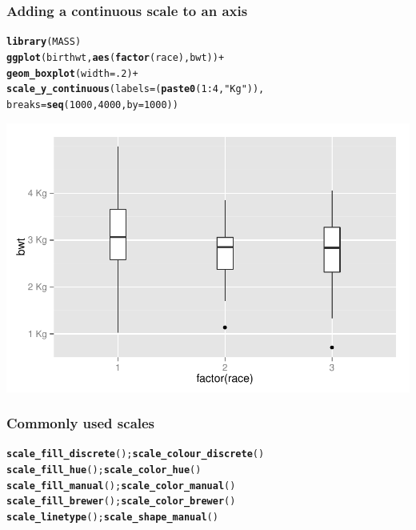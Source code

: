 \documentclass{beamer}\usepackage[]{graphicx}\usepackage[]{color}
\makeatletter
\newcommand{\hlnum}[1]{\textcolor[rgb]{0.686,0.059,0.569}{#1}}%
\newcommand{\hlstr}[1]{\textcolor[rgb]{0.192,0.494,0.8}{#1}}%
\newcommand{\hlopt}[1]{\textcolor[rgb]{0,0,0}{#1}}%
\newcommand{\hlstd}[1]{\textcolor[rgb]{0.345,0.345,0.345}{#1}}%
\newcommand{\hlkwc}[1]{\textcolor[rgb]{0.333,0.667,0.333}{#1}}%
\newcommand{\hlkwd}[1]{\textcolor[rgb]{0.737,0.353,0.396}{\textbf{#1}}}%
\newenvironment{kframe}{%
 \def\at@end@of@kframe{}%
 \ifinner\ifhmode%
  \def\at@end@of@kframe{\end{minipage}}%
  \begin{minipage}{\columnwidth}%
 \fi\fi%
 \def\FrameCommand##1{\hskip\@totalleftmargin \hskip-\fboxsep
 \colorbox{shadecolor}{##1}\hskip-\fboxsep
     \hskip-\linewidth \hskip-\@totalleftmargin \hskip\columnwidth}%
 \MakeFramed {\advance\hsize-\width
   \@totalleftmargin\z@ \linewidth\hsize
   \@setminipage}}%
 {\par\unskip\endMakeFramed%
 \at@end@of@kframe}
\newenvironment{knitrout}{}{} %
\makeatother
\begin{document}

\begin{frame}[fragile]
\frametitle{Adding a continuous scale to an axis}
\begin{knitrout}\footnotesize
{}\color{fgcolor}\begin{kframe}
\begin{alltt}
\hlkwd{library}\hlstd{(MASS)}
\hlkwd{ggplot}\hlstd{(birthwt,} \hlkwd{aes}\hlstd{(}\hlkwd{factor}\hlstd{(race), bwt))} \hlopt{+}
    \hlkwd{geom_boxplot}\hlstd{(}\hlkwc{width} \hlstd{=} \hlnum{.2}\hlstd{)} \hlopt{+}
    \hlkwd{scale_y_continuous}\hlstd{(}\hlkwc{labels} \hlstd{= (}\hlkwd{paste0}\hlstd{(}\hlnum{1}\hlopt{:}\hlnum{4}\hlstd{,} \hlstr{" Kg"}\hlstd{)),}
        \hlkwc{breaks} \hlstd{=} \hlkwd{seq}\hlstd{(}\hlnum{1000}\hlstd{,} \hlnum{4000}\hlstd{,} \hlkwc{by} \hlstd{=} \hlnum{1000}\hlstd{))}
\end{alltt}
\end{kframe}

{\centering \includegraphics[width=.75\linewidth]{figure/boxplots3} 

}



\end{knitrout}
\end{frame}


\begin{frame}[fragile]
\frametitle{Commonly used scales}
\begin{knitrout}\footnotesize
{}\color{fgcolor}\begin{kframe}
\begin{alltt}
\hlkwd{scale_fill_discrete}\hlstd{();} \hlkwd{scale_colour_discrete}\hlstd{()}
\hlkwd{scale_fill_hue}\hlstd{();} \hlkwd{scale_color_hue}\hlstd{()}
\hlkwd{scale_fill_manual}\hlstd{();}  \hlkwd{scale_color_manual}\hlstd{()}
\hlkwd{scale_fill_brewer}\hlstd{();} \hlkwd{scale_color_brewer}\hlstd{()}
\hlkwd{scale_linetype}\hlstd{();} \hlkwd{scale_shape_manual}\hlstd{()}
\end{alltt}
\end{kframe}
\end{knitrout}
\end{frame}
\end{document}
